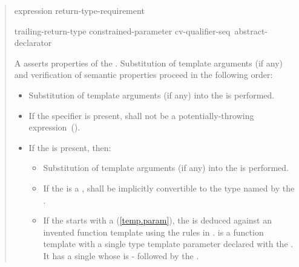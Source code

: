 \begin{quote}
\begin{addedblock}
\begin{bnf}
\br
  \terminal{\{} expression \terminal{\}} \opt 
    return-type-requirement\opt~\terminal{;}

\br
    trailing-return-type\br
    \terminal{->} constrained-parameter cv-qualifier-seq\opt~abstract-declarator\opt
\end{bnf}

\pnum
A  asserts properties
of the  . Substitution
of template arguments (if any) and verification of
semantic properties proceed in the following order:
%
\begin{itemize}
\item Substitution of template arguments (if any)
into the  is performed.

\item If the  specifier is present,
 shall not be a potentially-throwing expression~().

\item If the  is present, then:

\begin{itemize}
\item Substitution of template arguments (if any)
into the  is performed.

\item If the  is a 
,  shall be implicitly 
convertible to the type named by the
.

\item If the  starts with a 
 (\ref{temp.param}), the 
 is deduced against an invented function template
 using the rules in .  is a
 function template with a single type template parameter
 declared with the . 
It has a single  whose  is
- followed by the 
. 
\end{itemize}
\end{itemize}


\end{addedblock}
\end{quote}
